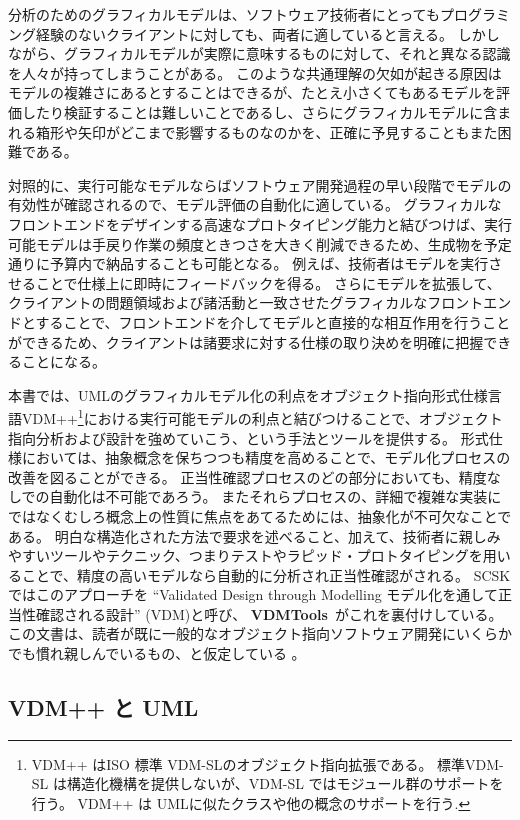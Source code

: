 \documentclass[\pformat,12pt,twoside]{jarticle}
\newcommand{\vdmtools}{\textbf{VDMTools}}
\begin{document}
分析のためのグラフィカルモデルは、ソフトウェア技術者にとってもプログラミング経験のないクライアントに対しても、両者に適していると言える。
しかしながら、グラフィカルモデルが実際に意味するものに対して、それと異なる認識を人々が持ってしまうことがある。
このような共通理解の欠如が起きる原因はモデルの複雑さにあるとすることはできるが、たとえ小さくてもあるモデルを評価したり検証することは難しいことであるし、さらにグラフィカルモデルに含まれる箱形や矢印がどこまで影響するものなのかを、正確に予見することもまた困難である。

対照的に、実行可能なモデルならばソフトウェア開発過程の早い段階でモデルの有効性が確認されるので、モデル評価の自動化に適している。
グラフィカルなフロントエンドをデザインする高速なプロトタイピング能力と結びつけば、実行可能モデルは手戻り作業の頻度ときつさを大きく削減できるため、生成物を予定通りに予算内で納品することも可能となる。
例えば、技術者はモデルを実行させることで仕様上に即時にフィードバックを得る。
さらにモデルを拡張して、クライアントの問題領域および諸活動と一致させたグラフィカルなフロントエンドとすることで、フロントエンドを介してモデルと直接的な相互作用を行うことができるため、クライアントは諸要求に対する仕様の取り決めを明確に把握できることになる。

本書では、UMLのグラフィカルモデル化の利点をオブジェクト指向形式仕様言語VDM++\footnote{{\small
VDM++ はISO 標準 VDM-SLのオブジェクト指向拡張である。
標準VDM-SL は構造化機構を提供しないが、VDM-SL
ではモジュール群のサポートを行う。  VDM++ は UMLに似たクラスや他の概念のサポートを行う}.}における実行可能モデルの利点と結びつけることで、オブジェクト指向分析および設計を強めていこう、という手法とツールを提供する。
 形式仕様においては、抽象概念を保ちつつも精度を高めることで、モデル化プロセスの改善を図ることができる。
正当性確認プロセスのどの部分においても、精度なしでの自動化は不可能であろう。
またそれらプロセスの、詳細で複雑な実装にではなくむしろ概念上の性質に焦点をあてるためには、抽象化が不可欠なことである。
明白な構造化された方法で要求を述べること、加えて、技術者に親しみやすいツールやテクニック、つまりテストやラピッド・プロトタイピングを用いることで、精度の高いモデルなら自動的に分析され正当性確認がされる。
SCSK ではこのアプローチを ``Validated Design through Modelling モデル化を通して正当性確認される設計'' (VDM)と呼び、 \vdmtools\ がこれを裏付けしている。
この文書は、読者が既に一般的なオブジェクト指向ソフトウェア開発にいくらかでも慣れ親しんでいるもの、と仮定している \cite{Meyer88,Shlaer88,Rumbaugh&91}。

\subsection{VDM++ と UML}
\end{document}
